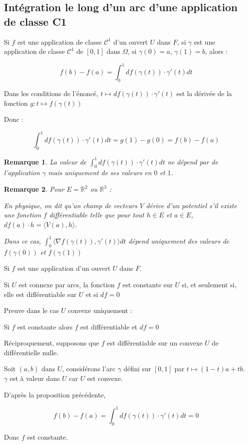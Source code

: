 \documentclass[a4paper,12pt]{book}
\newcommand{\Prop}[2]{\begin{tcolorbox}[sharp corners, colback=white,colframe=red!90!black!75, title=Proposition : #1]#2\end{tcolorbox}}
\newcommand{\Pre}[1]{\begin{tcolorbox}[sharp corners, colback=white,colframe=green!60!green!30!black!75, title=Preuve]#1\end{tcolorbox}}
\newtheorem{Rem}{Remarque}[section]
\def\R{\mathbb{R}}
\begin{document}
\subsection{Intégration le long d'un arc d'une application de classe C1}
\Prop{}{Si $f$ est une application de classe $\mathcal{C}^1$ d'un ouvert $U$ dans $F$, si $\gamma$ est une application de classe $\mathcal{C}^1$ de $[0,1]$ dans $\Omega$, si $\gamma(0)=a$, $\gamma(1)=b$, alors :
\par $$f(b)-f(a) = \int_0^1df(\gamma(t))\cdot\gamma'(t)dt$$}
\Pre{Dans les conditions de l'énoncé, $t\mapsto df(\gamma(t))\cdot\gamma'(t)$ est la dérivée de la fonction $g :t\mapsto f(\gamma(t))$
\par Donc :
\par $$\int_0^1df(\gamma(t))\cdot\gamma'(t)dt = g(1)-g(0) = f(b)-f(a)$$}
\begin{Rem}
La valeur de $\int_0^1df(\gamma(t))\cdot\gamma'(t)dt$ ne dépend par de l'application $\gamma$ mais uniquement de ses valeurs en $0$ et $1$.
\end{Rem}
\begin{Rem}
Pour $E=\R^2$ ou $\R^3$ :
\par En physique, on dit qu'un champ de vecteurs $V$ dérive d'un potentiel s'il existe une fonction $f$ différentiable telle que pour tout $h\in E$ et $a\in E$, $df(a)\cdot h = \langle V(a), h\rangle$.
\par Dans ce cas, $\int_0^1\langle\nabla f(\gamma(t)), \gamma'(t)\rangle dt$ dépend uniquement des valeurs de $f(\gamma(0))$ et $f(\gamma(1))$
\end{Rem}
\Prop{}{Si $f$ est une application d'un ouvert $U$ dans $F$.
\par Si $U$ est connexe par arcs, la fonction $f$ est constante sur $U$ si, et seulement si, elle est différentiable sur $U$ et si $df=0$}
\Pre{Preuve dans le cas $U$ convexe uniquement :
\par Si $f$ est constante alors $f$ est différentiable et $df=0$
\par Réciproquement, supposons que $f$ est différentiable sur un convexe $U$ de différentielle nulle.
\par Soit $(a,b)$ dans $U$, considérons l'arc $\gamma$ défini sur $[0,1]$ par $t\mapsto (1-t)a+tb$. $\gamma$ est à valeur dans $U$ car $U$ est convexe.
\par D'après la proposition précédente,
\par $$f(b)-f(a) = \int_0^1df(\gamma(t))\cdot\gamma'(t)dt=0$$
\par Donc $f$ est constante.}
\end{document}
